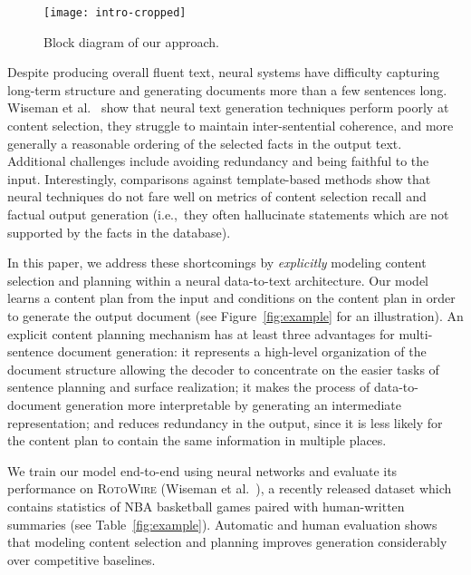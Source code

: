 \documentclass[letterpaper]{article} \usepackage{aaai19}  \usepackage{times}  \usepackage{helvet}  \usepackage{courier}  \usepackage{url}  \usepackage{graphicx}  \frenchspacing  \setlength{\pdfpagewidth}{8.5in}  \setlength{\pdfpageheight}{11in}  \graphicspath{ {images/} }
\begin{document}
\begin{figure}[t]
\texttt{[image: intro-cropped]}
\caption{Block diagram of our approach.}
\label{fig:rotowire-example}
\end{figure}

Despite producing overall fluent text, neural systems have difficulty
capturing long-term structure and generating documents more than a few
sentences long. Wiseman et al.~ show
that neural text generation techniques perform poorly at content
selection, they struggle to maintain inter-sentential coherence, and
more generally a reasonable ordering of the selected facts in the
output text. Additional challenges include avoiding redundancy and
being faithful to the input. Interestingly, comparisons against
template-based methods show that neural techniques do not fare well on
metrics of content selection recall and factual output generation
(i.e.,~they often hallucinate statements which are not supported by
the facts in the database).




In this paper, we address these shortcomings by \emph{explicitly}
modeling content selection and planning within a neural data-to-text
architecture.  Our model learns a content plan from the input and
conditions on the content plan in order to generate the output
document (see Figure~\ref{fig:example} for an illustration). An
explicit content planning mechanism has at least three advantages for
multi-sentence document generation: it represents a high-level
organization of the document structure allowing the decoder to
concentrate on the easier tasks of sentence planning and surface
realization; it makes the process of data-to-document generation more
interpretable by generating an intermediate representation; and
reduces redundancy in the output, since it is less likely for the
content plan to contain the same information in multiple places.

We train our model end-to-end using neural networks and evaluate
its performance on \textsc{RotoWire} (Wiseman et
al.~\citeyear{wiseman2017challenges}), a recently released dataset
which contains statistics of NBA basketball games paired with
human-written summaries (see Table~\ref{fig:example}). Automatic and
human evaluation shows that modeling content selection and
planning improves generation considerably over competitive baselines.
\end{document}
